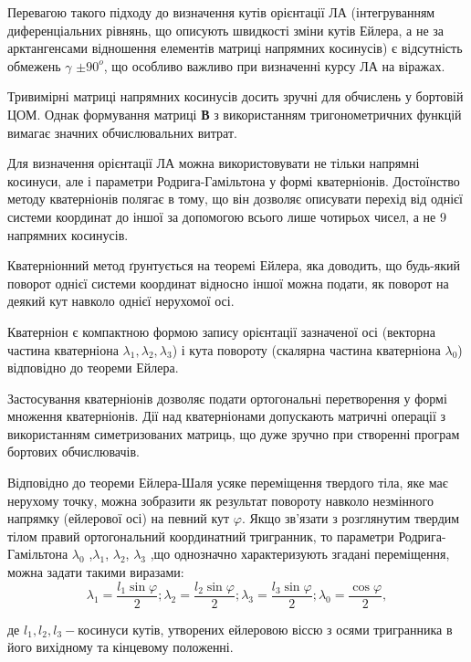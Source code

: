 Перевагою такого підходу до визначення кутів орієнтації ЛА (інтегруванням диференціальних 
рівнянь, що описують швидкості зміни кутів Ейлера, а не за арктангенсами відношення 
елементів матриці напрямних  косинусів) є відсутність обмежень $\gamma$ $\pm90^{o}$, 
що особливо важливо при визначенні курсу ЛА на віражах. 

Тривимірні матриці напрямних  косинусів досить зручні для обчислень у бортовій ЦОМ. 
Однак формування матриці \textbf{В} з використанням тригонометричних функцій вимагає 
значних обчислювальних витрат. 

Для визначення орієнтації ЛА можна використовувати не тільки напрямні косинуси, але 
і параметри Родрига-Гамільтона у формі кватерніонів. Достоїнство методу кватерніонів 
полягає в тому, що він дозволяє описувати перехід від однієї системи координат до 
іншої за допомогою всього лише чотирьох чисел, а не 9 напрямних  косинусів.

Кватерніонний метод ґрунтується  на теоремі Ейлера, яка доводить, що будь-який поворот 
однієї системи координат відносно іншої можна подати, як поворот на деякий кут навколо 
однієї нерухомої осі.

Кватерніон є компактною формою запису орієнтації зазначеної осі (векторна частина 
кватерніона $\lambda_{1} ,\lambda_{2} ,\lambda_{3} $) і кута повороту (скалярна 
частина кватерніона $\lambda_{0} $) відповідно до теореми Ейлера.

Застосування кватерніонів дозволяє подати ортогональні перетворення у формі множення 
кватерніонів. Дії над кватерніонами допускають матричні операції з використанням 
симетризованих матриць, що дуже зручно при створенні програм бортових обчислювачів. 

Відповідно 
до теореми Ейлера-Шаля усяке переміщення твердого тіла, яке має нерухому точку, можна 
зобразити як результат повороту навколо незмінного напрямку (ейлерової осі) на певний 
кут $\varphi $. Якщо зв'язати з розглянутим твердим тілом правий ортогональний координатний 
тригранник, то параметри Родрига-Гамільтона $\lambda_{0}$ ,$\lambda_{1}$, $\lambda_{2}$,
$\lambda_{3}$ ,що однозначно характеризують згадані переміщення, можна задати 
такими виразами: 
\[\lambda_{1} =\frac{l_{1} \sin \varphi }{2};
  \lambda_{2} =\frac{l_{2} \sin \varphi }{2};
  \lambda_{3} =\frac{l_{3} \sin \varphi }{2};
  \lambda_{0} =\frac{\cos \varphi }{2} ,\] 
\begin{ESKDexplanation}
 \item де $l_{1} ,l_{2} ,l_{3} -$косинуси кутів, утворених ейлеровою віссю з осями тригранника 
в його вихідному та кінцевому положенні. 
\end{ESKDexplanation}

